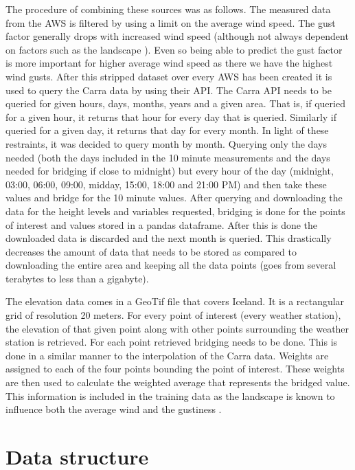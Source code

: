 The procedure of combining these sources was as follows. The measured data from the AWS is filtered by using a limit on the average wind speed. The gust factor generally drops with increased wind speed (although not always dependent on factors such as the landscape \cite{GNP_vidtal}). Even so being able to predict the gust factor is more important for higher average wind speed as there we have the highest wind gusts. After this stripped dataset over every AWS has been created it is used to query the Carra data by using their API. The Carra API needs to be queried for given hours, days, months, years and a given area. That is, if queried for a given hour, it returns that hour for every day that is queried. Similarly if queried for a given day, it returns that day for every month. In light of these restraints, it was decided to query month by month. Querying only the days needed (both the days included in the 10 minute measurements and the days needed for bridging if close to midnight) but every hour of the day (midnight, 03:00, 06:00, 09:00, midday, 15:00, 18:00 and 21:00 PM) and then take these values and bridge for the 10 minute values. After querying and downloading the data for the height levels and variables requested, bridging is done for the points of interest and values stored in a pandas dataframe. After this is done the downloaded data is discarded and the next month is queried. This drastically decreases the amount of data that needs to be stored as compared to downloading the entire area and keeping all the data points (goes from several terabytes to less than a gigabyte).

The elevation data comes in a GeoTif file that covers Iceland. It is a rectangular grid of resolution 20 meters. For every point of interest (every weather station), the elevation of that given point along with other points surrounding the weather station is retrieved. For each point retrieved bridging needs to be done. This is done in a similar manner to the interpolation of the Carra data. Weights are assigned to each of the four points bounding the point of interest. These weights are then used to calculate the weighted average that represents the bridged value. This information is included in the training data as the landscape is known to influence both the average wind and the gustiness \cite{GNP_vidtal}. 


\section{Data structure}

